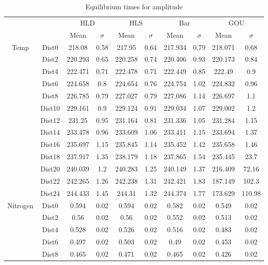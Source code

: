 \begin{table}[h]
\centering
\caption{Equilibrium times for amplitude}
\label{table:5}
\begin{tabular}{cccccccccc}
\toprule
{} & {} & \multicolumn{2}{c}{HLD} & \multicolumn{2}{c}{HLS} & \multicolumn{2}{c}{Bar} & \multicolumn{2}{c}{GOU} \\
{} & {} & {Mean} & {$\sigma$} & {Mean} & {$\sigma$} & {Mean} & {$\sigma$} & {Mean} & {$\sigma$} \\
\midrule
\multirow[c]{13}{*}{Temp} & Dist0 & 218.08 & 0.58 & 217.95 & 0.64 & 217.934 & 0.79 & 218.071 & 0.68 \\
 & Dist2 & 220.293 & 0.65 & 220.258 & 0.74 & 220.406 & 0.93 & 220.173 & 0.84 \\
 & Dist4 & 222.471 & 0.71 & 222.478 & 0.71 & 222.449 & 0.85 & 222.49 & 0.9 \\
 & Dist6 & 224.658 & 0.8 & 224.654 & 0.76 & 224.754 & 1.02 & 224.832 & 0.96 \\
 & Dist8 & 226.785 & 0.79 & 227.027 & 0.79 & 227.086 & 1.14 & 226.697 & 1.1 \\
 & Dist10 & 229.161 & 0.9 & 229.124 & 0.91 & 229.034 & 1.07 & 229.002 & 1.2 \\
 & Dist12 & 231.25 & 0.95 & 231.164 & 0.81 & 231.336 & 1.05 & 231.284 & 1.15 \\
 & Dist14 & 233.478 & 0.96 & 233.609 & 1.06 & 233.411 & 1.15 & 233.694 & 1.37 \\
 & Dist16 & 235.697 & 1.15 & 235.845 & 1.14 & 235.452 & 1.42 & 235.658 & 1.46 \\
 & Dist18 & 237.917 & 1.35 & 238.179 & 1.18 & 237.865 & 1.54 & 235.445 & 23.7 \\
 & Dist20 & 240.039 & 1.2 & 240.283 & 1.25 & 240.149 & 1.37 & 216.409 & 72.16 \\
 & Dist22 & 242.265 & 1.26 & 242.238 & 1.31 & 242.421 & 1.83 & 187.149 & 102.3 \\
 & Dist24 & 244.433 & 1.45 & 244.31 & 1.32 & 244.374 & 1.77 & 173.629 & 110.98 \\
\multirow[c]{13}{*}{Nitrogen} & Dist0 & 0.594 & 0.02 & 0.594 & 0.02 & 0.582 & 0.02 & 0.549 & 0.02 \\
 & Dist2 & 0.56 & 0.02 & 0.56 & 0.02 & 0.552 & 0.02 & 0.513 & 0.02 \\
 & Dist4 & 0.528 & 0.02 & 0.526 & 0.02 & 0.516 & 0.02 & 0.483 & 0.02 \\
 & Dist6 & 0.497 & 0.02 & 0.503 & 0.02 & 0.49 & 0.02 & 0.453 & 0.02 \\
 & Dist8 & 0.465 & 0.02 & 0.471 & 0.02 & 0.465 & 0.02 & 0.426 & 0.02 \\

\end{tabular}
\end{table}
